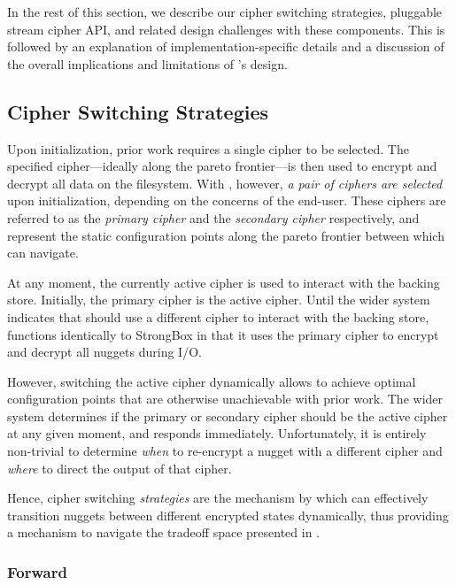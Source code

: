 In the rest of this section, we describe our cipher switching strategies,
pluggable stream cipher API, and related design challenges with these
components. This is followed by an explanation of implementation-specific
details and a discussion of the overall implications and limitations of
\SYSTEM{}'s design.

\subsection{Cipher Switching Strategies}

Upon initialization, prior work requires a single cipher to be selected. The
specified cipher---ideally along the pareto frontier---is then used to encrypt
and decrypt all data on the filesystem. With \SYSTEM{}, however, \emph{a pair of
ciphers are selected} upon initialization, depending on the concerns of the
end-user. These ciphers are referred to as the \emph{primary cipher} and the
\emph{secondary cipher} respectively, and represent the static configuration
points along the pareto frontier between which \SYSTEM{} can navigate.

At any moment, the currently active cipher is used to interact with the backing
store. Initially, the primary cipher is the active cipher. Until the wider
system indicates that \SYSTEM{} should use a different cipher to interact with
the backing store, \SYSTEM{} functions identically to StrongBox in that it uses
the primary cipher to encrypt and decrypt all nuggets during I/O.

However, switching the active cipher dynamically allows \SYSTEM{} to achieve
optimal configuration points that are otherwise unachievable with prior work.
The wider system determines if the primary or secondary cipher should be the
active cipher at any given moment, and \SYSTEM{} responds immediately.
Unfortunately, it is entirely non-trivial to determine \emph{when} to re-encrypt
a nugget with a different cipher and \emph{where} to direct the output of that
cipher.

Hence, cipher switching \emph{strategies} are the mechanism by which \SYSTEM{}
can effectively transition nuggets between different encrypted states
dynamically, thus providing a mechanism to navigate the tradeoff space presented
in
. 

\subsubsection{Forward}

